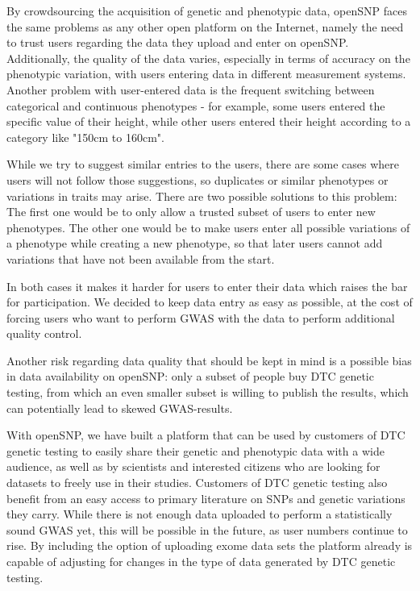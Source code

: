 \documentclass[10pt]{article}
\begin{document}
By crowdsourcing the acquisition of genetic and phenotypic data, openSNP faces the same problems as any other 
open platform on the Internet, namely the need to trust users regarding the data they upload and enter on openSNP. 
Additionally, the quality of the data varies, especially in terms of accuracy on the phenotypic variation, 
with users entering data in different measurement systems. Another problem with user-entered data is the frequent switching between categorical and continuous phenotypes - for example, some users entered the specific value of their height, while other users entered their height according to a category like "150cm to 160cm". 

While we try to suggest similar entries to the users, 
there are some cases where users will not follow those suggestions, so duplicates or similar phenotypes or variations in traits may arise. There are two possible solutions to this problem: The first one would be to only allow a trusted subset of users to enter new phenotypes. The other one 
would be to make users enter all possible variations of a phenotype while creating a new phenotype, so that later users cannot add 
variations that have not been available from the start. 

In both cases it makes it harder 
for users to enter their data which raises the bar for participation.
We decided to keep data entry as easy as possible, at the cost of forcing users who want to perform GWAS with the data to perform additional quality control.

Another risk regarding data quality that should be kept in mind is a possible bias in data availability on openSNP: only a subset of people buy DTC genetic testing, from which an even smaller subset is willing to publish the results, which can potentially lead to skewed GWAS-results.

With openSNP, we have built a platform that can be used by customers of DTC genetic testing to easily share their genetic and phenotypic 
data with a wide audience, as well as by scientists and interested citizens who are looking for datasets to freely use in their studies.
Customers of DTC genetic testing also benefit from an easy access to primary literature on SNPs and genetic variations they carry. 
While there is not enough data uploaded to perform a statistically sound GWAS yet, this will be possible in the future, as user numbers continue to rise. By including the option of uploading exome data sets the platform already is capable of adjusting for changes in the type of data generated by DTC genetic testing.
\end{document}
